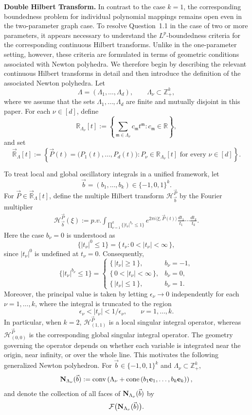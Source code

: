 \documentclass[11 pt,letterpaper]{amsart}
\theoremstyle{plain}
\theoremstyle{definition}
\theoremstyle{remark} \theoremstyle{exam} \theoremstyle{ob}
\numberwithin{equation}{section}
\begin{document}
\noindent\textbf{Double Hilbert Transform.}
In contrast to the case $k=1$, the corresponding boundedness problem
for individual polynomial mappings remains open even in the
two-parameter graph case.  To resolve Question~1.1 in the case of two or more parameters, it appears necessary to understand the $L^p$-boundedness criteria for the corresponding continuous Hilbert transforms. Unlike in the one-parameter setting, however, these criteria are formulated in terms of geometric conditions associated with Newton polyhedra. We therefore begin by describing the relevant continuous Hilbert transforms in  detail and then introduce the definition of the associated Newton polyhedra.
 Let
\[
\Lambda=(\Lambda_1,\ldots,\Lambda_d),
\qquad
\Lambda_\nu\subset\mathbb Z_+^k,
\]  
where we assume that the sets $\Lambda_1,\ldots,\Lambda_d$ are finite and mutually disjoint in this paper. For
each $\nu\in[d]$, define
\[
\mathbb R_{\Lambda_\nu}[t]
:=
\left\{
\sum_{\mathfrak m\in\Lambda_\nu}
c_{\mathfrak m}t^{\mathfrak m}
:
c_{\mathfrak m}\in\mathbb R
\right\},
\]
and set
\[
\vec{\mathbb R}_{\Lambda}[t]
:=
\left\{
\vec P(t)=\bigl(P_1(t),\ldots,P_d(t)\bigr)
:
P_\nu\in\mathbb R_{\Lambda_\nu}[t]
\text{ for every }\nu\in[d]
\right\}.
\]

To treat local and global oscillatory integrals in a unified framework,
let
\[
\vec b=(b_1,\ldots,b_k)\in \{-1,0,1\}^k.
\]
For $\vec P\in\vec{\mathbb R}_{\Lambda}[t]$, define the multiple Hilbert
transform $ \bm{\mathcal{H}}^{\vec P}_{\vec b}$ by the Fourier multiplier
\begin{align}\label{os11}
	\mathcal H^{\vec P}_{\vec b}(\xi)
	:=p.v.
	\int_{\prod_{\nu=1}^k
		\{ |t_\nu|^{b_\nu}\le 1\}}
	e^{2\pi i\langle\xi,\vec P(t)\rangle}
	\frac{dt_1}{t_1}\cdots\frac{dt_k}{t_k}.
\end{align}
Here the case $b_\nu=0$ is understood as
\[
\{|t_\nu|^0\le1\}
=
\{\,t_\nu:0<|t_\nu|<\infty\,\},
\]
since $|t_\nu|^0$ is undefined at $t_\nu=0$.
Consequently,
\[
\{|t_\nu|^{b_\nu}\le1\}
=
\begin{cases}
	\{\,|t_\nu|\ge1\,\}, & b_\nu=-1,\\
	\{\,0<|t_\nu|<\infty\,\}, & b_\nu=0,\\
	\{\,|t_\nu|\le1\,\}, & b_\nu=1.
\end{cases}
\]
Moreover, the principal value is taken by letting
$\epsilon_\nu\rightarrow0$ independently for each
$\nu=1,\ldots,k$, where the integral is truncated to the region
\[
\epsilon_\nu<|t_\nu|<1/\epsilon_\nu,
\qquad
\nu=1,\ldots,k.
\]
In particular, when $k=2$,
$\bm{\mathcal{H}}^{\vec P}_{(1,1)}$
is a local singular integral operator, whereas
$\bm{\mathcal{H}}^{\vec P}_{(0,0)}$
is the corresponding global singular integral operator.
The geometry governing the operator depends on whether each variable is
integrated near the origin, near infinity, or over the whole line.
This motivates the following generalized Newton polyhedron.
For $\vec b\in\{-1,0,1\}^k$ and $\Lambda_{\nu}\subset \mathbb{Z}_+^k$, 
\[
{\bf N}_{\Lambda_\nu}(\vec b)
:=
\operatorname{conv}
\left(
\Lambda_\nu+
\operatorname{cone}
\left( b_1{\bf e}_1,
\ldots,
b_k{\bf e}_k 
\right)
\right),
\]
and  denote the collection of all faces of
${\bf N}_{\Lambda_\nu}(\vec b)$ by
\[
\mathcal F\bigl({\bf N}_{\Lambda_\nu}(\vec b)\bigr).
\]
\end{document}
